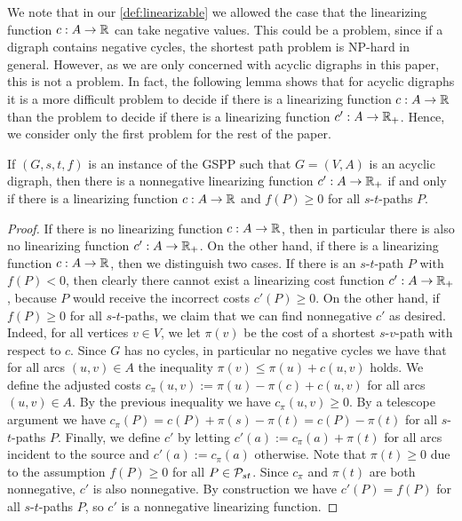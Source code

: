 We note that in our \cref{def:linearizable} we allowed the case that the linearizing function $c : A \to \mathbb{R}$ can take negative values. This could be a problem, since if a digraph contains negative cycles, the shortest path problem is NP-hard in general. However, as we are only concerned with acyclic digraphs in this paper, this is not a problem. In fact, the following lemma shows that for acyclic digraphs it is a more difficult problem to decide if there is a linearizing function $c : A \to \mathbb{R}$ than the problem to decide if there is a linearizing function $c': A \to \mathbb{R}_+$. Hence, we consider only the first problem for the rest of the paper.
\begin{lemma}
If $(G,s,t,f)$ is an instance of the GSPP such that $G  = (V,A)$ is an acyclic digraph, then there is a nonnegative linearizing function $c' : A \to \mathbb{R}_+$ if and only if there is a linearizing function $c : A \to \mathbb{R}$ and $f(P) \geq 0$ for all $s$-$t$-paths $P$.
\end{lemma}
\begin{proof}
If there is no linearizing function $c : A \to \mathbb{R}$, then in particular there is also no linearizing function $c' : A \to \mathbb{R}_+$. On the other hand, if there is a linearizing function $c : A \to \mathbb{R}$, then we distinguish two cases. If there is an $s$-$t$-path $P$ with $f(P) < 0$, then clearly there cannot exist a linearizing cost function  $c' : A \to \mathbb{R}_+$, because $P$ would receive the incorrect costs $c'(P) \geq 0$. On the other hand, if $f(P) \geq 0$ for all $s$-$t$-paths, we claim that we can find nonnegative $c'$ as desired. Indeed, for all vertices $v \in V$, we let $\pi(v)$ be the cost of a shortest $s$-$v$-path with respect to $c$. Since $G$ has no cycles, in particular no negative cycles we have that for all arcs $(u,v) \in A$ the inequality $\pi(v) \leq \pi(u) + c(u,v)$ holds. We define the adjusted costs $c_\pi(u,v) := \pi(u) - \pi(c) + c(u,v)$ for all arcs $(u,v) \in A$. By the previous inequality we have $c_\pi(u,v) \geq 0$. By a telescope argument we have $c_\pi(P) = c(P) + \pi(s) - \pi(t) = c(P) - \pi(t)$ for all $s$-$t$-paths $P$. Finally, we define $c'$ by letting $c'(a) := c_\pi (a) + \pi(t)$ for all arcs incident to the source and $c'(a) := c_\pi(a)$ otherwise. Note that $\pi(t) \geq 0$ due to the assumption $f(P) \geq 0$ for all $P \in \mathcal{P}_{st}$. Since $c_\pi$ and $\pi(t)$ are both nonnegative, $c'$ is also nonnegative. By construction we have $c'(P) = f(P)$ for all $s$-$t$-paths $P$, so $c'$ is a nonnegative linearizing function. 
\end{proof}
